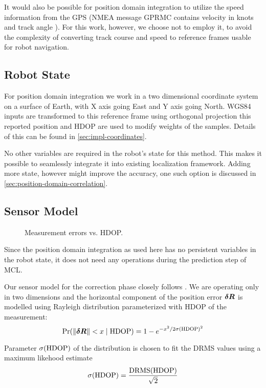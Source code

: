 It would also be possible for position domain integration to utilize the speed information
from the GPS (NMEA message GPRMC contains velocity in knots and track angle \cite{depriest}).
For this work, however, we choose not to employ it, to avoid the complexity of converting
track course and speed to reference frames usable for robot navigation.

\subsection{Robot State}
For position domain integration we work in a two dimensional coordinate
system on a surface of Earth, with X axis going East and Y axis going North.
WGS84 inputs are transformed to this reference frame using orthogonal projection
this reported position and HDOP are used to modify weights of the samples.
Details of this can be found in \cref{sec:impl-coordinates}.

No other variables are required in the robot's state for this method.
This makes it possible to seamlessly integrate it into existing localization framework.
Adding  more state, however might improve the accuracy, one such option
is discussed in \cref{sec:position-domain-correlation}.

\subsection{Sensor Model}
\label{sec:wgs84-hdop-error}

\begin{figure}[htp]
	\centering
	\noindent{}
	\caption{Measurement errors vs. HDOP.}
	\label{fig:wgs84-hdop-error}
\end{figure}

Since the position domain integration as used here has no persistent variables in the
robot state, it does not need any operations during the prediction step of MCL.

Our sensor model for the correction phase closely follows \cite{www-wilson}.
We are operating only in two dimensions and
the horizontal component of the position error  \(\bm{\delta R}\) is modelled using Rayleigh distribution
parameterized with HDOP of the measurement:
\begin{equation}
	\operatorname{\mathrm{Pr}}(\lVert\bm{\delta R}\rVert < x \mid \mathrm{HDOP}) =
		1 - e^{-x^2/2\sigma(\mathrm{HDOP})^2}
\end{equation}

Parameter \(\sigma(\mathrm{HDOP})\) of the distribution is chosen to fit the DRMS values using a maximum likehood estimate
\begin{equation}
	\sigma(\mathrm{HDOP}) = \frac{\mathrm{DRMS}(\mathrm{HDOP})}{\sqrt{2}}
\end{equation}


